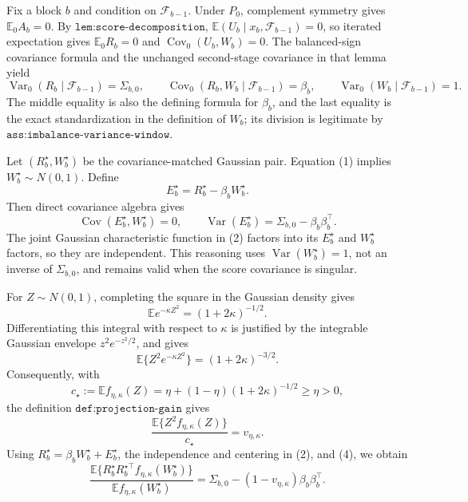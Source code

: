 Fix a block \(b\) and condition on \(\mathcal F_{b-1}\).  Under \(P_0\), complement symmetry gives \(\mathbb E_0A_b=0\).  By \(\texttt{lem:score-decomposition}\), \(\mathbb E(U_b\mid x_b,\mathcal F_{b-1})=0\), so iterated expectation gives \(\mathbb E_0R_b=0\) and \(\operatorname{Cov}_0(U_b,W_b)=0\).  The balanced-sign covariance formula and the unchanged second-stage covariance in that lemma yield
\[
 \operatorname{Var}_0(R_b\mid\mathcal F_{b-1})=\Sigma_{b,0},
 \qquad
 \operatorname{Cov}_0(R_b,W_b\mid\mathcal F_{b-1})=\beta_b,
 \qquad
 \operatorname{Var}_0(W_b\mid\mathcal F_{b-1})=1.          \tag{1}
\]
The middle equality is also the defining formula for \(\beta_b\), and the last equality is the exact standardization in the definition of \(W_b\); its division is legitimate by \(\texttt{ass:imbalance-variance-window}\).

Let \((R_b^\star,W_b^\star)\) be the covariance-matched Gaussian pair.  Equation (1) implies \(W_b^\star\sim N(0,1)\).  Define
\[
 E_b^\star=R_b^\star-\beta_bW_b^\star.
\]
Then direct covariance algebra gives
\[
 \operatorname{Cov}(E_b^\star,W_b^\star)=0,
 \qquad
 \operatorname{Var}(E_b^\star)=\Sigma_{b,0}-\beta_b\beta_b^\top. \tag{2}
\]
The joint Gaussian characteristic function in (2) factors into its \(E_b^\star\) and \(W_b^\star\) factors, so they are independent.  This reasoning uses \(\operatorname{Var}(W_b^\star)=1\), not an inverse of \(\Sigma_{b,0}\), and remains valid when the score covariance is singular.

For \(Z\sim N(0,1)\), completing the square in the Gaussian density gives
\[
 \mathbb E e^{-\kappa Z^2}=(1+2\kappa)^{-1/2}.
\]
Differentiating this integral with respect to \(\kappa\) is justified by the integrable Gaussian envelope \(z^2e^{-z^2/2}\), and gives
\[
 \mathbb E\{Z^2e^{-\kappa Z^2}\}=(1+2\kappa)^{-3/2}.       \tag{3}
\]
Consequently, with
\[
 c_\star:=\mathbb Ef_{\eta,\kappa}(Z)
 =\eta+(1-\eta)(1+2\kappa)^{-1/2}\geq\eta>0,
\]
the definition \(\texttt{def:projection-gain}\) gives
\[
 \frac{\mathbb E\{Z^2f_{\eta,\kappa}(Z)\}}{c_\star}
 =v_{\eta,\kappa}.                                        \tag{4}
\]
Using \(R_b^\star=\beta_bW_b^\star+E_b^\star\), the independence and centering in (2), and (4), we obtain
\[
 \frac{\mathbb E\{R_b^\star R_b^{\star\top}
                     f_{\eta,\kappa}(W_b^\star)\}}
      {\mathbb Ef_{\eta,\kappa}(W_b^\star)}
 =\Sigma_{b,0}-(1-v_{\eta,\kappa})\beta_b\beta_b^\top.   \tag{5}
\]

